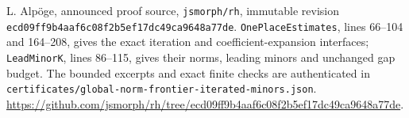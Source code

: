L. Alp\"oge, announced proof source, \texttt{jsmorph/rh},
immutable revision
\texttt{ecd09ff9b4aaf6c08f2b5ef17dc49ca9648a77de}.
\texttt{OnePlaceEstimates}, lines 66--104 and 164--208,
gives the exact iteration and coefficient-expansion interfaces;
\texttt{LeadMinorK}, lines 86--115, gives their norms,
leading minors and unchanged gap budget.
The bounded excerpts and exact finite checks are authenticated in
\texttt{certificates/global-norm-frontier-iterated-minors.json}.
\url{https://github.com/jsmorph/rh/tree/ecd09ff9b4aaf6c08f2b5ef17dc49ca9648a77de}.
